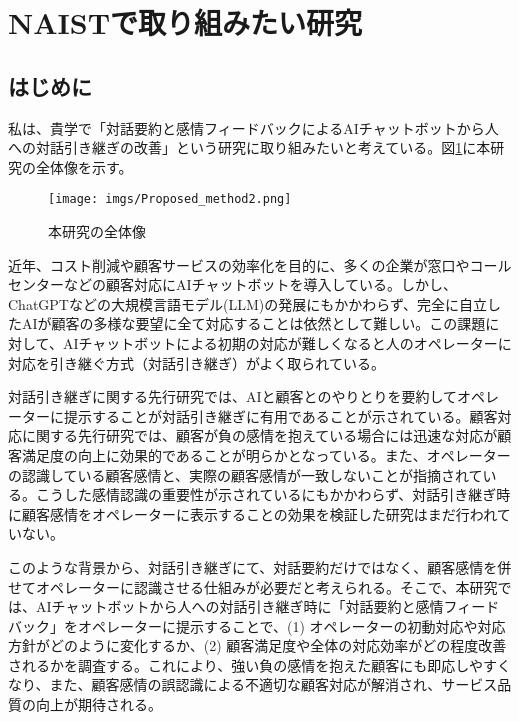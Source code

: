 \documentclass[a4j,10pt, twocolumn]{jarticle}
\begin{document}

\section{NAISTで取り組みたい研究}
\subsection{はじめに}
私は、貴学で「対話要約と感情フィードバックによるAIチャットボットから人への対話引き継ぎの改善」という研究に取り組みたいと考えている。図\ref{Proposed_method2}に本研究の全体像を示す。

\begin{figure}[H]
    \centering
    \texttt{[image: imgs/Proposed\_method2.png]}
    \caption{本研究の全体像}
    \label{Proposed_method2}
\end{figure}

近年、コスト削減や顧客サービスの効率化を目的に、多くの企業が窓口やコールセンターなどの顧客対応にAIチャットボットを導入している。しかし、ChatGPTなどの大規模言語モデル(LLM)の発展にもかかわらず、完全に自立したAIが顧客の多様な要望に全て対応することは依然として難しい。この課題に対して、AIチャットボットによる初期の対応が難しくなると人のオペレーターに対応を引き継ぐ方式（対話引き継ぎ）がよく取られている。

対話引き継ぎに関する先行研究では、AIと顧客とのやりとりを要約してオペレーターに提示することが対話引き継ぎに有用であることが示されている\cite{Effectiveness of the summary}。顧客対応に関する先行研究では、顧客が負の感情を抱えている場合には迅速な対応が顧客満足度の向上に効果的であることが明らかとなっている\cite{Emotion Importance}。また、オペレーターの認識している顧客感情と、実際の顧客感情が一致しないことが指摘されている\cite{Emotion role}。こうした感情認識の重要性が示されているにもかかわらず、対話引き継ぎ時に顧客感情をオペレーターに表示することの効果を検証した研究はまだ行われていない。

このような背景から、対話引き継ぎにて、対話要約だけではなく、顧客感情を併せてオペレーターに認識させる仕組みが必要だと考えられる。そこで、本研究では、AIチャットボットから人への対話引き継ぎ時に「対話要約と感情フィードバック」をオペレーターに提示することで、(1) オペレーターの初動対応や対応方針がどのように変化するか、(2)  顧客満足度や全体の対応効率がどの程度改善されるかを調査する。これにより、強い負の感情を抱えた顧客にも即応しやすくなり、また、顧客感情の誤認識による不適切な顧客対応が解消され、サービス品質の向上が期待される。
\end{document}

